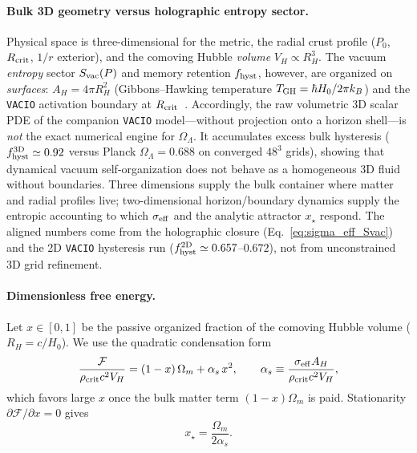 \documentclass[prd,
               reprint,
               aps,
               preprintnumbers,
               nofootinbib,
               longbibliography,
               floatfix]{revtex4-2}
\begin{document}
\paragraph{Bulk 3D geometry versus holographic entropy sector.}
Physical space is three-dimensional for the metric, the radial crust
profile ($P_0$, $R_{\rm crit}$, $1/r$ exterior), and the comoving
Hubble \emph{volume} $V_H\propto R_H^3$.
The vacuum \emph{entropy} sector $S_{\rm vac}(P)$ and memory retention
$f_{\rm hyst}$, however, are organized on \emph{surfaces}:
$A_H=4\pi R_H^2$ (Gibbons--Hawking temperature
$T_{\rm GH}=\hbar H_0/2\pi k_B$) and the \texttt{VACIO} activation
boundary at $R_{\rm crit}$~\cite{Cohen1999,Li2004,Bekenstein1973,Gibbons1977}.
Accordingly, the raw volumetric 3D scalar PDE of the companion
\texttt{VACIO} model---without projection onto a horizon shell---is
\emph{not} the exact numerical engine for $\Omega_\Lambda$.
It accumulates excess bulk hysteresis ($f_{\rm hyst}^{\rm 3D}\simeq 0.92$
versus Planck $\Omega_\Lambda=0.688$ on converged $48^3$ grids), showing
that dynamical vacuum self-organization does not behave as a homogeneous
3D fluid without boundaries.
Three dimensions supply the bulk container where matter and radial
profiles live; two-dimensional horizon/boundary dynamics supply the
entropic accounting to which $\sigma_{\rm eff}$ and the analytic attractor
$x_\star$ respond.
The aligned numbers come from the holographic closure
(Eq.~\eqref{eq:sigma_eff_Svac})~\cite{Cohen1999,Li2004,tHooft1993} and the 2D \texttt{VACIO} hysteresis run
($f_{\rm hyst}^{\rm 2D}\simeq 0.657$--$0.672$), not from unconstrained
3D grid refinement.

\paragraph{Dimensionless free energy.}
Let $x\in[0,1]$ be the passive organized fraction of the comoving
Hubble volume ($R_H=c/H_0$).
We use the quadratic condensation form
\begin{equation}
\label{eq:F_horizon_dimless}
\frac{\mathcal{F}}{ \rho_{\rm crit}c^2 V_H}
=
(1-x)\,\Omega_m
+
\alpha_s\,x^2,
\qquad
\alpha_s
\equiv
\frac{\sigma_{\rm eff}A_H}{\rho_{\rm crit}c^2V_H},
\end{equation}
which favors large $x$ once the bulk matter term $(1-x)\Omega_m$ is
paid.
Stationarity $\partial\mathcal{F}/\partial x=0$ gives
\begin{equation}
\label{eq:xstar_quadratic}
x_\star
=
\frac{\Omega_m}{2\alpha_s}.
\end{equation}
\end{document}
